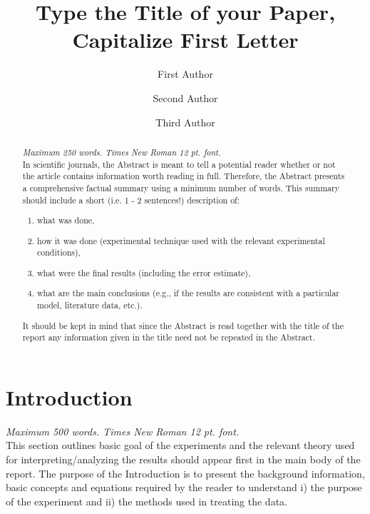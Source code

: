 \documentclass[letterpaper,12pt]{article}
\title{Type the Title of your Paper, Capitalize First Letter}
\author[1]{First Author}
\author[2]{Second Author}
\author[1]{Third Author}
\affil[1]{First affiliation, Address, City and Postcode, country}
\affil[2]{Second affiliation, Address, City and Postcode, Country}
\date{}                     %
\begin{document}
\maketitle %


\begin{abstract}

\vspace{0.2cm}
\noindent
{\it Maximum 250 words. Times New Roman 12 pt. font.}\\

\noindent
In scientific journals, the Abstract is meant to tell a potential reader whether or not the article contains information worth reading in full. Therefore, the Abstract presents a comprehensive factual summary using a minimum number of words. This summary should include a short (i.e. 1 - 2 sentences!) description of: 
\begin{enumerate}
\item	what was done, 
\item	how it was done (experimental technique used with the relevant experimental conditions), 
\item	what were the final results (including the error estimate),
\item	what are the main conclusions (e.g., if the results are
consistent with a particular model, literature data, etc.). 
\end{enumerate}
It should be kept in mind that since the Abstract is read together with the title of the report any information given in the title need not be repeated in the Abstract. 
  
\end{abstract}




\section{Introduction}
{\it Maximum 500 words. Times New Roman 12 pt. font.}\\
        
This section outlines basic goal of the experiments and the relevant theory used for interpreting/analyzing the results should appear first in the main body of the report. The purpose of the Introduction is to present the background information, basic concepts and equations required by the reader to understand i) the purpose of the experiment and ii) the methods used in treating the data. 
\end{document}
